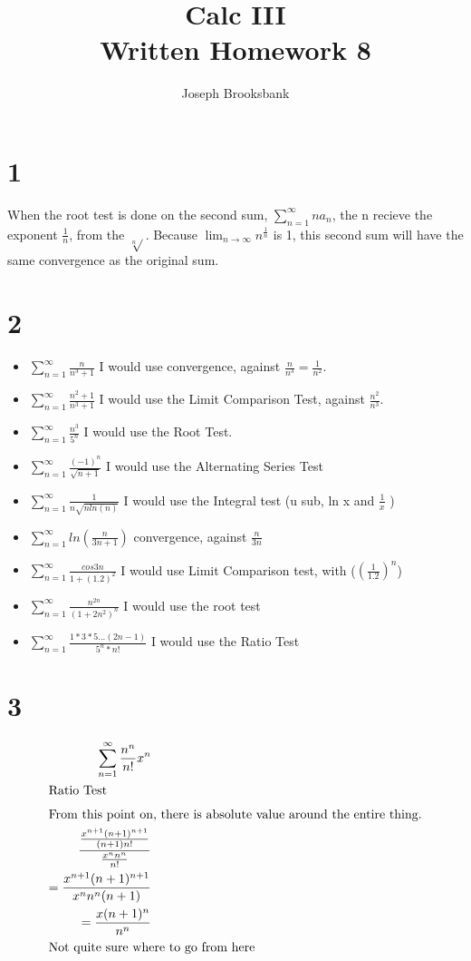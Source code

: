 \documentclass[12pt]{article}
\title{Calc III \\ Written Homework 8}
\author{Joseph Brooksbank}
\begin{document}
\maketitle

\section*{1}
When the root test is done on the second sum, $\sum_{n=1}^{\infty} na_n$, the n recieve the exponent  $\frac{1}{n}$, from the $\sqrt[n]{} $. Because $\lim_{n\to\infty} n^{\frac{1}{n}}$ is 1, this second sum will have the same convergence as the original sum.

\section*{2}
\begin{itemize}
        \item $\sum_{n=1}^{\infty} \frac{n}{n^{3}+1}$ I would use convergence, against $\frac{n}{n^{3}} = \frac{1}{n^{2}}$.
        \item $\sum_{n=1}^{\infty} \frac{n^{2}+1}{n^{3}+1}$ I would use the Limit Comparison Test, against $\frac{n^{2}}{n^{3}}$.
        \item $\sum_{n=1}^{\infty} \frac{n^{3}}{5^{n}} $ I would use the Root Test. 
        \item $\sum_{n=1}^{\infty} \frac{(-1)^{n}}{\sqrt{n+1}} $ I would use the Alternating Series Test
        \item $\sum_{n=1}^{\infty} \frac{1}{n\sqrt{nln(n)} } $ I would use the Integral test (u sub, ln x and $\frac{1}{x}$ )
        \item $\sum_{n=1}^{\infty} ln(\frac{n}{3n+1}) $ convergence, against $\frac{n}{3n}$ 
        \item $\sum_{n=1}^{\infty} \frac{cos 3n}{1 + (1.2)^{2}} $ I would use Limit Comparison test, with ($(\frac{1}{1.2})^{n}$)
        \item $\sum_{n=1}^{\infty} \frac{n^{2n}}{(1+2n^{2})^{n}}$ I would use the root test
        \item $\sum_{n=1}^{\infty} \frac{1 * 3 * 5... (2n - 1)}{5^{n}*n!} $ I would use the Ratio Test 
\end{itemize}

\section*{3}
\begin{align*}
        \sum_{n=1}^{\infty} \frac{n^{n}}{n!}x^{n} \\
        \shortintertext{Ratio Test}
        \shortintertext{From this point on, there is absolute value around the entire thing.} 
        \frac{\frac{x^{n+1}(n+1)^{n+1}}{(n+1)n!}}{\frac{x^{n}n^{n}}{n!}}\\
        = \frac{x^{n+1}(n+1)^{n+1}}{x^{n}n^{n}(n+1)}\\
        = \frac{x(n+1)^{n}}{n^{n}} \\
        \shortintertext{Not quite sure where to go from here} 
\end{align*}
\end{document}
